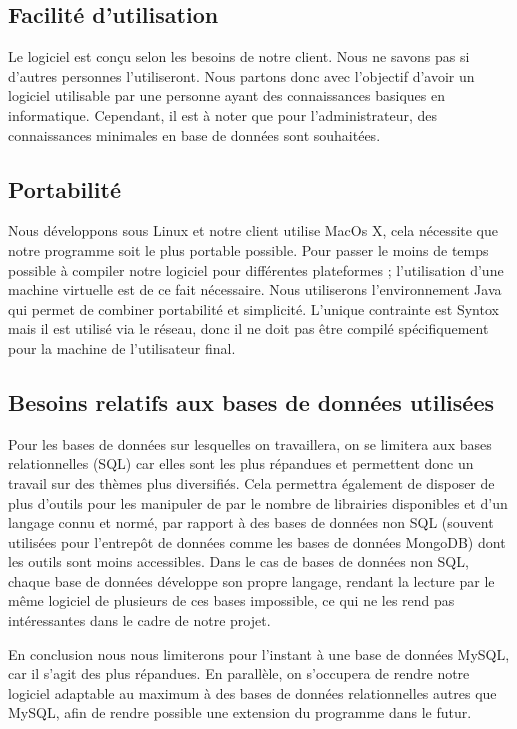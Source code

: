 \documentclass[12pt]{report}
\begin{document}
\subsection{Facilité d'utilisation}

Le logiciel est conçu selon les besoins de notre client. Nous ne
savons pas si d'autres personnes l'utiliseront. Nous partons donc avec
l'objectif d'avoir un logiciel utilisable par une personne ayant des
connaissances basiques en informatique. Cependant, il est à noter que
pour l'administrateur, des connaissances minimales en base de données sont
souhaitées.

\subsection{Portabilité}

Nous développons sous Linux et notre client utilise MacOs X, cela
nécessite que notre programme soit le plus portable possible.
Pour passer le moins de temps possible à compiler notre logiciel pour
différentes plateformes ; l'utilisation d'une machine virtuelle est de
ce fait nécessaire.
Nous utiliserons l'environnement Java qui permet de combiner portabilité
et simplicité.
L'unique contrainte est Syntox mais il est utilisé via le réseau, donc
il ne doit pas être compilé spécifiquement pour la machine de
l'utilisateur final.

\subsection{Besoins relatifs aux bases de données utilisées}
  
Pour les bases de données sur lesquelles on travaillera, on se limitera
aux bases relationnelles (SQL) car elles sont les plus répandues et
permettent donc un travail sur des thèmes plus diversifiés. Cela
permettra également de disposer de plus d'outils pour les manipuler de
par le nombre de librairies disponibles et d'un langage connu et normé,
par rapport à des bases de données non SQL (souvent utilisées pour
l'entrepôt de données comme les bases de données MongoDB) dont les
outils sont moins accessibles. Dans le cas de bases de données non SQL,
chaque base de données développe son propre langage, rendant la lecture
par le même logiciel de plusieurs de ces bases impossible, ce qui ne les
rend pas intéressantes dans le cadre de notre projet.

En conclusion nous nous limiterons pour l'instant à une base de données
MySQL, car il s'agit des plus répandues. En parallèle, on s'occupera de
rendre notre logiciel adaptable au maximum à des bases de données
relationnelles autres que MySQL, afin de rendre possible une extension
du programme dans le futur.
\end{document}
